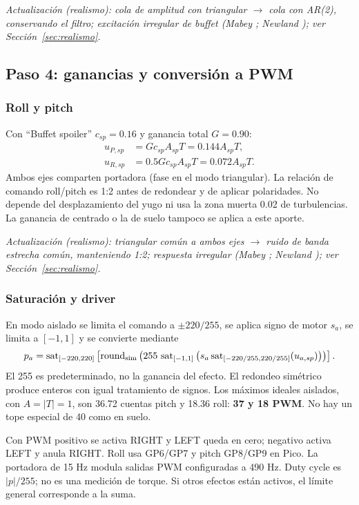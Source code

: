 \textit{Actualización (realismo): cola de amplitud con triangular $\rightarrow$ cola con AR(2), conservando el filtro; excitación irregular de buffet (Mabey \cite{mabey1988}; Newland \cite{newland1993}); ver Sección~\ref{sec:realismo}.}

\subsection{Paso 4: ganancias y conversión a PWM}
\subsubsection{Roll y pitch}
Con ``Buffet spoiler'' $c_{sp}=0.16$ y ganancia total $G=0.90$:
\begin{align}
u_{P,sp}&=Gc_{sp}A_{sp}T=0.144A_{sp}T,\\
u_{R,sp}&=0.5Gc_{sp}A_{sp}T=0.072A_{sp}T.
\end{align}
Ambos ejes comparten portadora (fase en el modo triangular). La relación de comando roll/pitch es 1:2 antes de redondear y de aplicar polaridades. No depende del desplazamiento del yugo ni usa la zona muerta 0.02 de turbulencias. La ganancia de centrado o la de suelo tampoco se aplica a este aporte.

\textit{Actualización (realismo): triangular común a ambos ejes $\rightarrow$ ruido de banda estrecha común, manteniendo 1:2; respuesta irregular (Mabey \cite{mabey1988}; Newland \cite{newland1993}); ver Sección~\ref{sec:realismo}.}

\subsubsection{Saturación y driver}
En modo aislado se limita el comando a $\pm220/255$, se aplica signo de motor $s_a$, se limita a $[-1,1]$ y se convierte mediante
\begin{equation}
p_a=\operatorname{sat}_{[-220,220]}\left[\operatorname{round}_{\rm sim}
\left(255\,\operatorname{sat}_{[-1,1]}\left(s_a\operatorname{sat}_{[-220/255,220/255]}(u_{a,sp})\right)\right)\right].
\end{equation}
El 255 es  predeterminado, no la ganancia del efecto. El redondeo simétrico produce enteros con igual tratamiento de signos. Los máximos ideales aislados, con $A=|T|=1$, son 36.72 cuentas pitch y 18.36 roll: \textbf{37 y 18 PWM}. No hay un tope especial de 40 como en suelo.

Con PWM positivo se activa RIGHT y LEFT queda en cero; negativo activa LEFT y anula RIGHT. Roll usa GP6/GP7 y pitch GP8/GP9 en Pico. La portadora de 15 Hz modula salidas PWM configuradas a 490 Hz. Duty cycle es $|p|/255$; no es una medición de torque. Si otros efectos están activos, el límite general corresponde a la suma.

